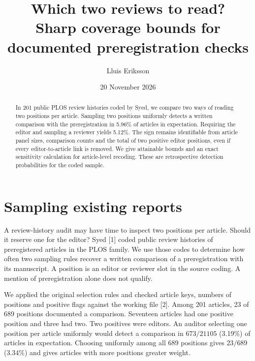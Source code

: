 \documentclass[11pt]{article}
\title{Which two reviews to read?\\ Sharp coverage bounds for documented preregistration checks}
\author{Lluis Eriksson}
\date{20 November 2026}
\begin{document}
\maketitle
\begin{abstract}
In 201 public PLOS review histories coded by Syed, we compare two ways of reading two positions per article. Sampling two positions uniformly detects a written comparison with the preregistration in 5.96\% of articles in expectation. Requiring the editor and sampling a reviewer yields 5.12\%. The sign remains identifiable from article panel sizes, comparison counts and the total of two positive editor positions, even if every editor-to-article link is removed. We give attainable bounds and an exact sensitivity calculation for article-level recoding. These are retrospective detection probabilities for the coded sample.
\end{abstract}
\section{Sampling existing reports}
A review-history audit may have time to inspect two positions per article. Should it reserve one for the editor? Syed [1] coded public review histories of preregistered articles in the PLOS family. We use those codes to determine how often two sampling rules recover a written comparison of a preregistration with its manuscript. A position is an editor or reviewer slot in the source coding. A mention of preregistration alone does not qualify.

We applied the original selection rules and checked article keys, numbers of positions and positive flags against the working file [2]. Among 201 articles, 23 of 689 positions documented a comparison. Seventeen articles had one positive position and three had two. Two positives were editors. An auditor selecting one position per article uniformly would detect a comparison in $673/21105$ (3.19\%) of articles in expectation. Choosing uniformly among all 689 positions gives $23/689$ (3.34\%) and gives articles with more positions greater weight.
\end{document}
